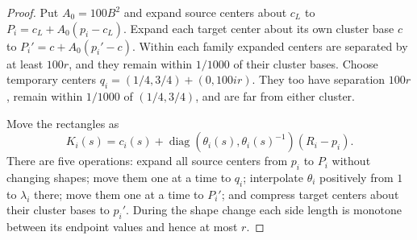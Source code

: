 \begin{proof}
Put $A_0=100B^2$ and expand source centers about $c_L$ to $P_i=c_L+A_0(p_i-c_L)$. Expand each target center about its own cluster base $c$ to $P_i'=c+A_0(p_i'-c)$. Within each family expanded centers are separated by at least $100r$, and they remain within $1/1000$ of their cluster bases. Choose temporary centers
$q_i=(1/4,3/4)+(0,100ir)$.
They too have separation $100r$, remain within $1/1000$ of $(1/4,3/4)$, and are far from either cluster.

Move the rectangles as
\[
 K_i(s)=c_i(s)+\operatorname{diag}(\theta_i(s),\theta_i(s)^{-1})(R_i-p_i).
\]
There are five operations: expand all source centers from $p_i$ to $P_i$ without changing shapes; move them one at a time to $q_i$; interpolate $\theta_i$ positively from $1$ to $\lambda_i$ there; move them one at a time to $P_i'$; and compress target centers about their cluster bases to $p_i'$. During the shape change each side length is monotone between its endpoint values and hence at most $r$.


\end{proof}
